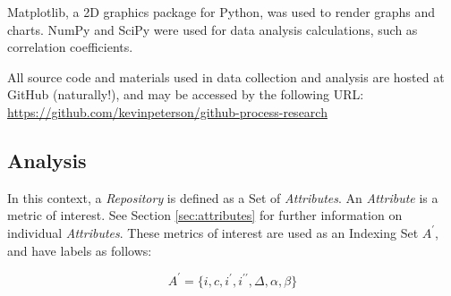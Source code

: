 \documentclass{proc}
\begin{document}
Matplotlib\cite{Hunter2007}, a 2D graphics package for Python, was used to render graphs and charts. NumPy and SciPy\cite{scipy} were used for data analysis calculations, such as correlation coefficients.

All source code and materials used in data collection and analysis are hosted at GitHub (naturally!), and may be accessed by the following URL: \url{https://github.com/kevinpeterson/github-process-research}

\subsection{Analysis}
In this context, a \textit{Repository} is defined as a Set of \textit{Attributes}. An \textit{Attribute} is a metric of interest. See Section \ref{sec:attributes} for further information on individual \textit{Attributes}. These metrics of interest are used as an Indexing Set $A^\prime$, and have labels as follows:

\[A^\prime = \{i, c, i^\prime, i^{\prime\prime}, \Delta, \alpha, \beta\}\]
\end{document}
